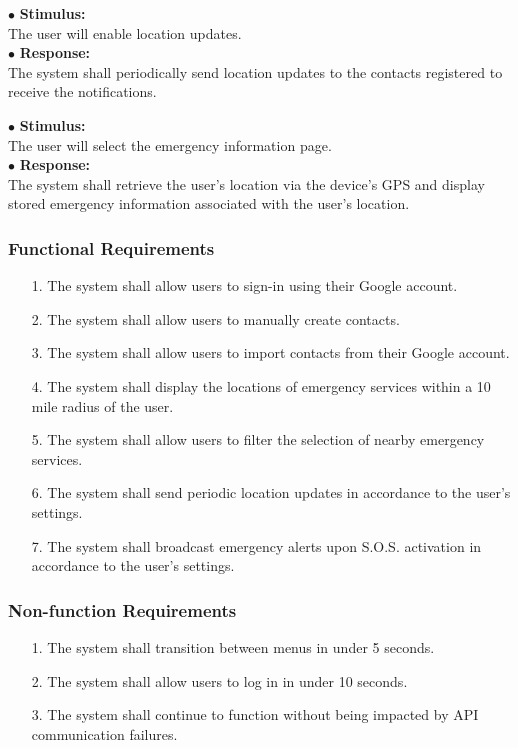 \documentclass{scrreprt}
\begin{document}
\vspace{5mm}
	\hspace{-4.75mm} $\bullet$ \textbf{Stimulus:} \\ \hspace{5mm} The user will enable location updates.\\
	$\bullet$ \textbf{Response:} \\ \hspace{5mm} The system shall periodically send location updates to the contacts registered to receive the notifications.
\newpage

\vspace{5mm}
	\hspace{-4.75mm} $\bullet$ \textbf{Stimulus:} \\ \hspace{5mm} The user will select the emergency information page.\\
	$\bullet$ \textbf{Response:} \\ \hspace{5mm} The system shall retrieve the user's location via the device's GPS and display stored emergency information associated with the user's location.


\subsubsection{Functional Requirements}
\begin{enumerate}
	\item[1.] The system shall allow users to sign-in using their Google account.
	\item[2.] The system shall allow users to manually create contacts.
	\item[3.] The system shall allow users to import contacts from their Google account.
	\item[4.] The system shall display the locations of emergency services within a 10 mile radius of the user.
	\item[5.] The system shall allow users to filter the selection of nearby emergency services.
	\item[6.] The system shall send periodic location updates in accordance to the user's settings.
	\item[7.] The system shall broadcast emergency alerts upon S.O.S. activation in accordance to the user's settings.
\end{enumerate}

\subsubsection{Non-function Requirements}
\begin{enumerate}
	\item[1.] The system shall transition between menus in under 5 seconds.
	\item[2.] The system shall allow users to log in in under 10 seconds.
	\item[3.] The system shall continue to function without being impacted by API communication failures.
\end{enumerate}
\end{document}
